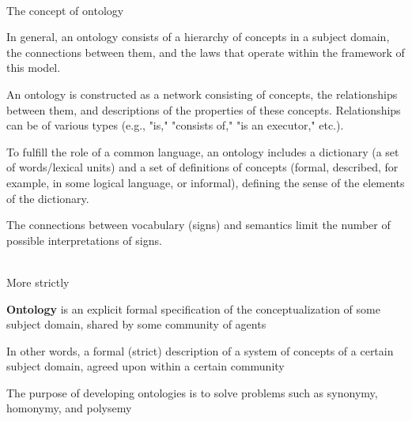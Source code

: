 \begin{frame}{\\The concept of ontology}
	\topline
	\justifying
	
	\vspace{2em}
	In general, an ontology consists of a hierarchy of concepts in a subject domain, the connections between them, and the laws that operate within the framework of this model.
	
	\vspace{0.5em}
	An ontology is constructed as a network consisting of concepts, the relationships between them, and descriptions of the properties of these concepts. Relationships can be of various types (e.g., "is," "consists of," "is an executor," etc.).
	
	\vspace{0.5em}
	To fulfill the role of a common language, an ontology includes a dictionary (a set of words/lexical units) and a set of definitions of concepts (formal, described, for example, in some logical language, or informal), defining the sense of the elements of the dictionary.
	
	\vspace{0.5em}
	The connections between vocabulary (signs) and semantics limit the number of possible interpretations of signs.
	
\end{frame}

\begin{frame}{\\More strictly}
	\topline
	\justifying
	
	\begin{textitemize}
		\item \textbf{Ontology} is an explicit formal specification of the conceptualization of some subject domain, shared by some community of agents
		\begin{textitemize}
			\item In other words, a formal (strict) description of a system of concepts of a certain subject domain, agreed upon within a certain community
			\item The purpose of developing ontologies is to solve problems such as synonymy, homonymy, and polysemy
		\end{textitemize}
	\end{textitemize}
	
\end{frame}

